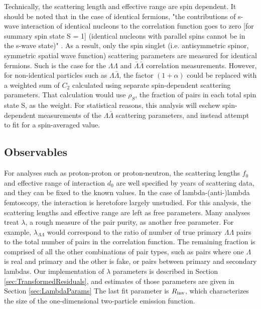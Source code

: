 Technically, the scattering length and effective range are spin dependent.  
It should be noted that in the case of identical fermions, "the contributions of s-wave interaction of identical nucleons to the correlation function goes to zero [for summary spin state S = 1] (identical nucleons with parallel spins cannot be in the s-wave state)" \cite{lednicky82}.  
As a result, only the spin singlet (i.e. antisymmetric spinor, symmetric spatial wave function) scattering parameters are measured for identical fermions.  
Such is the case for the $\Lambda\Lambda$ and $\bar{\Lambda}\bar{\Lambda}$ correlation measurements.  
However, for non-identical particles such as $\Lambda\bar{\Lambda}$, the factor $(1+\alpha)$ could be replaced with a weighted sum of $C_2$ calculated using separate spin-dependent scattering parameters.  
That calculation would use $\rho_S$, the fraction of pairs in each total spin state S, as the weight.  
For statistical reasons, this analysis will eschew spin-dependent measurements of the $\Lambda\bar{\Lambda}$ scattering parameters, and instead attempt to fit for a spin-averaged value.


\subsection{Observables}
\label{sec:Observables}
For analyses such as proton-proton or proton-neutron, the scattering lengths $f_0$ and effective range of interaction $d_0$ are well specified by years of scattering data, and they can be fixed to the known values.  
In the case of lambda-(anti-)lambda femtoscopy, the interaction is heretofore largely unstudied.  
For this analysis, the scattering lengths and effective range are left as free parameters.  
Many analyses treat $\lambda$, a rough measure of the pair purity, as another free parameter.  
For example, $\lambda_{\Lambda\Lambda}$ would correspond to the ratio of number of true primary $\Lambda\Lambda$ pairs to the total number of pairs in the correlation function. 
The remaining fraction is comprised of all the other combinations of pair types, such as pairs where one $\Lambda$ is real and primary and the other is fake, or pairs between primary and secondary lambdas.  
Our implementation of $\lambda$ parameters is described in Section \ref{sec:TransformedResiduals}, and estimates of those parameters are given in Section \ref{sec:LambdaParams}
The last fit parameter is $R_{\rm inv}$, which characterizes the size of the one-dimensional two-particle emission function.


